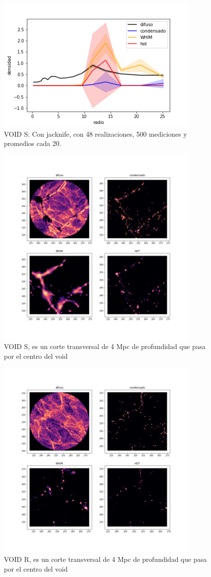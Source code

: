 \begin{figure}[h]
\centering
\includegraphics[width=10cm]{Figures/ProfFases_S.png}
\decoRule
\caption[asd]{VOID S: Con jacknife, con 48 realizaciones, 500 mediciones y promedios cada 20. }
\label{fig:Electron}
\end{figure}





\begin{figure}[h]
\centering
\includegraphics[width=10cm]{Figures/FasesHexbin_S.png}
\decoRule
\caption[asd]{VOID S, es un corte transversal de 4 Mpc de profundidad que pasa por el centro del void }
\label{fig:Electron}
\end{figure}

\begin{figure}[h]
\centering
\includegraphics[width=10cm]{Figures/FasesHexbin_R.png}
\decoRule
\caption[asd]{VOID R, es un corte transversal de 4 Mpc de profundidad que pasa por el centro del void }
\label{fig:Electron}
\end{figure}